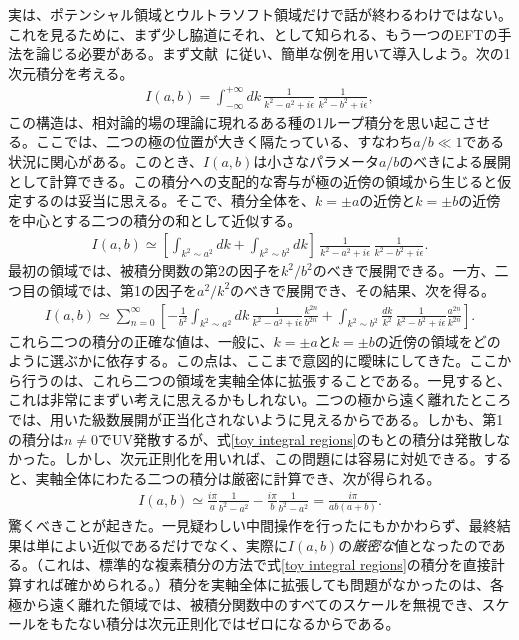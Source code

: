 実は、ポテンシャル領域とウルトラソフト領域だけで話が終わるわけではない。これを見るために、まず少し脇道にそれ、として知られる、もう一つのEFTの手法を論じる必要がある。まず文献~\cite{Griesshammer:1997wz}に従い、簡単な例を用いて導入しよう。次の1次元積分を考える。
%
\begin{align} \label{toy integral regions}
	I(a, b) = \int_{- \infty}^{+\infty}  dk \, \frac{1}{k^2 - a^2+ i \epsilon}\, \frac{1}{k^2 - b^2 + i \epsilon},
\end{align}
%
この構造は、相対論的場の理論に現れるある種の1ループ積分を思い起こさせる。ここでは、二つの極の位置が大きく隔たっている、すなわち$ a / b \ll 1$である状況に関心がある。このとき、$I(a, b)$は小さなパラメータ$a / b$のべきによる展開として計算できる。この積分への支配的な寄与が極の近傍の領域から生じると仮定するのは妥当に思える。そこで、積分全体を、$k= \pm a$の近傍と$k=\pm b$の近傍を中心とする二つの積分の和として近似する。
%
\begin{align}
	I(a, b) \simeq  \left[ \int_{k^2 \sim a^2} dk + \int_{k^2 \sim b^2} dk \right] \, \frac{1}{k^2 - a^2+ i \epsilon}\, \frac{1}{k^2 - b^2 + i \epsilon}. 
\end{align}
%
最初の領域では、被積分関数の第2の因子を$k^2/b^2$のべきで展開できる。一方、二つ目の領域では、第1の因子を$a^2/k^2$のべきで展開でき、その結果、次を得る。
%
\begin{align} \label{toy 2 regions}
	I(a, b) \simeq \sum_{n=0}^\infty \left[ -\frac{1}{b^2}\int_{k^2 \sim a^2} dk  \, \frac{1}{k^2 - a^2+ i \epsilon} \frac{k^{2n}}{b^{2n}}  + \int_{k^2 \sim b^2} \frac{dk}{k^2} \, \frac{1}{k^2 - b^2 + i \epsilon} \frac{a^{2n}}{k^{2n}}  \right]. 
\end{align}
%
これら二つの積分の正確な値は、一般に、$k= \pm a$と$k=\pm b$の近傍の領域をどのように選ぶかに依存する。この点は、ここまで意図的に曖昧にしてきた。ここから行うのは、これら二つの領域を実軸全体に拡張することである。一見すると、これは非常にまずい考えに思えるかもしれない。二つの極から遠く離れたところでは、用いた級数展開が正当化されないように見えるからである。しかも、第1の積分は$n \neq 0$でUV発散するが、式\eqref{toy integral regions}のもとの積分は発散しなかった。しかし、次元正則化を用いれば、この問題には容易に対処できる。すると、実軸全体にわたる二つの積分は厳密に計算でき、次が得られる。
%
\begin{align}
	I(a, b) \simeq \frac{i \pi}{a} \frac{1}{b^2 - a^2} - \frac{i \pi}{b} \frac{1}{b^2 - a^2} = \frac{i \pi}{ab (a+b)}. 
\end{align}
%
驚くべきことが起きた。一見疑わしい中間操作を行ったにもかかわらず、最終結果は単によい近似であるだけでなく、実際に$I(a,b)$の\emph{厳密な}値となったのである。（これは、標準的な複素積分の方法で式\eqref{toy integral regions}の積分を直接計算すれば確かめられる。）積分を実軸全体に拡張しても問題がなかったのは、各極から遠く離れた領域では、被積分関数中のすべてのスケールを無視でき、スケールをもたない積分は次元正則化ではゼロになるからである。

